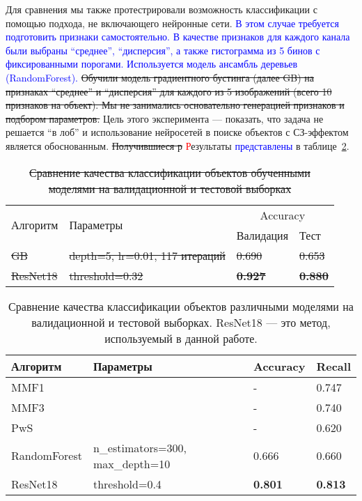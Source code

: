 \documentclass[
aps,%
12pt,%
final,%
notitlepage,%
oneside,%
onecolumn,%
nobibnotes,%
nofootinbib,%
superscriptaddress,%
noshowpacs,%
centertags]%
{revtex4}
\begin{document}
Для сравнения мы также протестрировали возможность классификации с помощью подхода, не включающего нейронные сети. \textcolor{blue}{В этом случае требуется подготовить признаки самостоятельно. В качестве признаков для каждого канала были выбраны ``среднее'', ``дисперсия'', а также гистограмма из 5 бинов с фиксированными порогами. Используется модель ансамбль деревьев (RandomForest). }
\sout{Обучили модель градиентного бустинга (далее GB) на признаках ``среднее'' и ``дисперсия'' для каждого из 5 изображений (всего 10 признаков на объект). Мы не занимались основательно генерацией признаков и подбором параметров.} Цель этого эксперимента --- показать, что задача не решается ``в лоб'' и использование нейросетей в поиске объектов с СЗ-эффектом является обоснованным. \sout{Получившиеся р} \textcolor{red}{Р}езультаты \textcolor{blue}{представлены} в таблице~\ref{table:comparison}.


\begin{table}[!h]
\onelinecaptionstrue
\setcaptionmargin{5mm}
\begin{tabular}{|l|l|l|l|}
\hline
\multirow{2}{*}{Алгоритм} & \multirow{2}{*}{Параметры} & 
\multicolumn{2}{c|}{Accuracy} \\
 &  & Валидация & Тест \\
\hline
\sout{GB} & \sout{depth=5, lr=0.01, 117 итераций} & \sout{0.690} & \sout{0.653} \\
\sout{ResNet18} & \sout{threshold=0.32} & \sout{\textbf{0.927}} & \sout{ \textbf{0.880}} \\
\hline
\end{tabular}
\caption{\sout{Сравнение качества классификации объектов обученными моделями на валидационной и тестовой выборках}}
\label{table:comparison}
\end{table}


\begin{table}[!h]
\onelinecaptionstrue
\setcaptionmargin{5mm}
\textcolor{red}{\begin{tabular}{|l|l|l|l|}
\hline
Алгоритм & Параметры & Accuracy & Recall \\
\hline
MMF1 & & - & 0.747 \\
MMF3 & & - & 0.740 \\
PwS &  & - & 0.620 \\
RandomForest & n\_estimators=300, max\_depth=10 & 0.666 & 0.660 \\
ResNet18 & threshold=0.4 & \textbf{0.801} & \textbf{0.813} \\
\hline
\end{tabular}
\caption{Сравнение качества классификации объектов различными моделями на валидационной и тестовой выборках. ResNet18 --- это метод, используемый в данной работе.}
\label{table:comparison}}
\end{table}
\end{document}
